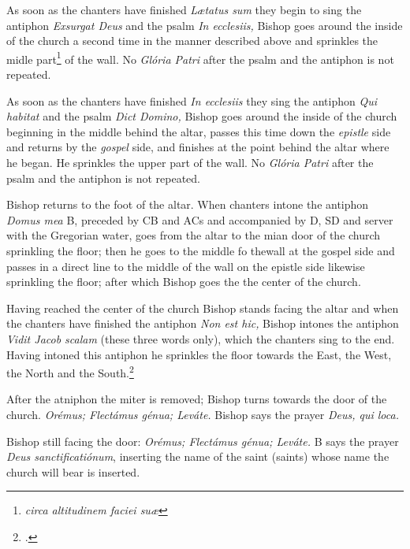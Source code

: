 \documentclass[letterpaper]{report}
\begin{document}
{\rubric As soon as the chanters have finished \textit{L\ae tatus sum} they
begin to sing the antiphon \textit{Exsurgat Deus} and the psalm \textit{In
ecclesiis,} Bishop goes around the inside of the church a second time in the manner
described above and sprinkles the midle part\footnote{\textit{circa altitudinem
faciei su\ae}} of the wall. No \textit{Glória Patri} after the psalm and the
antiphon is not repeated.

\rubric As soon as the chanters have finished \textit{In ecclesiis} they sing
the antiphon \textit{Qui habitat} and the psalm \textit{Dict Domino,} Bishop goes
around the inside of the church beginning in the middle behind the altar,
passes this time down the \textit{epistle} side and returns by the
\textit{gospel} side, and finishes at the point behind the altar where he
began. He sprinkles the upper part of the wall. No \textit{Glória Patri} after
the psalm and the antiphon is not repeated.

\rubric Bishop returns to the foot of the altar. When chanters intone the antiphon
\textit{Domus mea} B, preceded by CB and ACs and accompanied by D, SD and
server with the Gregorian water, goes from the altar to the mian door of the
church sprinkling the floor; then he goes to the middle fo thewall at the
gospel side and passes in a direct line to the middle of the wall on the
epistle side likewise sprinkling the floor; after which Bishop goes the the center
of the church.

\rubric Having reached the center of the church Bishop stands facing the altar and
when the chanters have finished the antiphon \textit{Non est hic,} Bishop intones
the antiphon \textit{Vidit Jacob scalam} (these three words only), which the
chanters sing to the end. Having intoned this antiphon he sprinkles the floor
towards the East, the West, the North and the South.\footcite[The Rubric in the
\textit{Pontificale Romanum} supposes the altar to be towards the East; the
bishop, therefore, sprinkles the floor before him, behind him, at his left and
than at his right.][footnote 1, p. 74.]{consecranda}

\rubric After the atniphon the miter is removed; Bishop turns towards the door of
the church. \textit{Orémus; Flectámus génua; Leváte.} Bishop says the prayer
\textit{Deus, qui loca.}

\rubric Bishop still facing the door: \textit{Orémus; Flectámus génua; Leváte.} B
says the prayer \textit{Deus sanctificatiónum}, inserting the name of the saint
(saints) whose name the church will bear is inserted.

}
\end{document}

